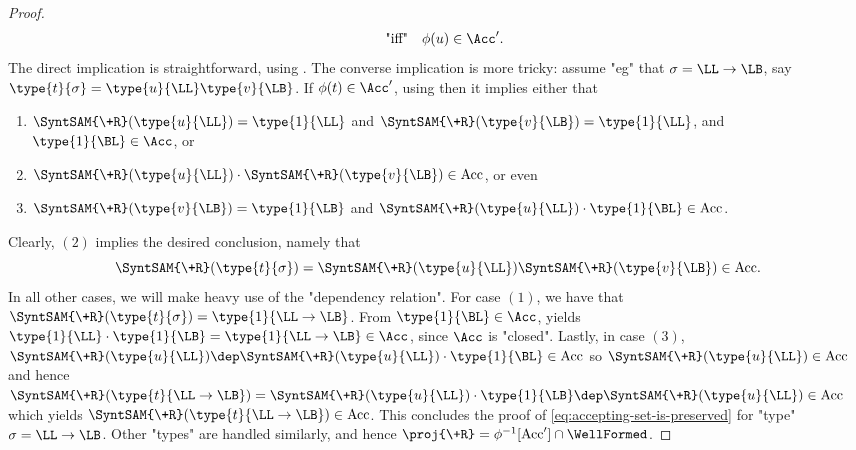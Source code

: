 \begin{proof}
\begin{equation}
		\quad\text{"iff"}\quad
		\phi(u) \in \Acc'.
		\label{eq:accepting-set-is-preserved}
	\end{equation}
	The direct implication is straightforward, using
	.
	The converse implication is more tricky: assume "eg" that $\sigma = \LL\to\LB$,
	say $\type{t}{\sigma} = \type{u}{\LL}\type{v}{\LB}$.
	If $\phi(t) \in \Acc'$, using  then it implies either that
	\begin{enumerate}
		\item $\SyntSAM{\+R}(\type{u}{\LL}) = \type{1}{\LL}$ and $\SyntSAM{\+R}(\type{v}{\LB}) = \type{1}{\LL}$, and $\type{1}{\BL} \in \Acc$, or
		\item $\SyntSAM{\+R}(\type{u}{\LL})\cdot \SyntSAM{\+R}(\type{v}{\LB}) \in \Acc$, or even
		\item $\SyntSAM{\+R}(\type{v}{\LB}) = \type{1}{\LB}$ and
			$\SyntSAM{\+R}(\type{u}{\LL})\cdot \type{1}{\BL} \in \Acc$.
	\end{enumerate}
	Clearly, $(2)$ implies the desired conclusion, namely that
	\[\SyntSAM{\+R}(\type{t}{\sigma}) = \SyntSAM{\+R}(\type{u}{\LL})\SyntSAM{\+R}(\type{v}{\LB}) \in \Acc.\]
	In all other cases, we will make heavy use of the "dependency relation".
	For case $(1)$, we have that $\SyntSAM{\+R}(\type{t}{\sigma}) = \type{1}{\LL\to\LB}$.
	From $\type{1}{\BL} \in \Acc$,  yields $\type{1}{\LL} \cdot \type{1}{\LB} = \type{1}{\LL\to\LB} \in \Acc$, since $\Acc$ is "closed".
	Lastly, in case $(3)$, $\SyntSAM{\+R}(\type{u}{\LL}) \dep
	\SyntSAM{\+R}(\type{u}{\LL})\cdot \type{1}{\BL} \in \Acc$ so
	$\SyntSAM{\+R}(\type{u}{\LL}) \in \Acc$ and hence
	$\SyntSAM{\+R}(\type{t}{\LL\to\LB}) = \SyntSAM{\+R}(\type{u}{\LL}) \cdot \type{1}{\LB}
	\dep \SyntSAM{\+R}(\type{u}{\LL}) \in \Acc$ which yields
	$\SyntSAM{\+R}(\type{t}{\LL\to\LB}) \in \Acc$. This concludes the proof
	of \eqref{eq:accepting-set-is-preserved} for "type" $\sigma = \LL\to\LB$.
	Other "types" are handled similarly, and hence
	$\proj{\+R} = \phi^{-1}[\Acc']\cap\WellFormed$.
\end{proof}

